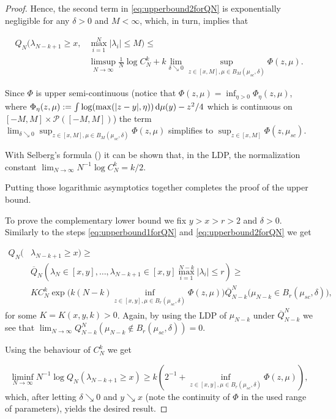\begin{proof}
	Hence, the second term in \ref{eq:upperbound2forQN} is exponentially negligible for any $\delta >0$ and $M<\infty$, which, in turn, implies that
	
	\begin{align}
		Q_N(\lambda_{N-k+1}\geq x,&\max_{i=1}^N|\lambda_i|\leq M)\leq \nonumber\\
		&\limsup_{N\rightarrow\infty}\frac{1}{N}\log C_N^k + k\lim_{\delta\searrow 0}\sup_{z\in[x,M],\mu\in B_M(\mu_{sc},\delta)}\Phi(z,\mu).
	\end{align}
	
	Since $\Phi$ is upper semi-continuous (notice that $\Phi(z,\mu)=\inf_{\eta>0}\Phi_{\eta}(z,\mu)$, where $\Phi_{\eta}(z,\mu) := \int \log(\max(|z-y|,\eta))\mathop{}\!\mathrm{d}\mu(y)-z^2/4$ which is continuous on $[-M,M]\times\mathcal P([-M,M])$) the term $\lim_{\delta\searrow 0}\sup_{z\in[x,M],\mu\in B_M(\mu_{sc},\delta)}\Phi(z,\mu)$ simplifies to $\sup_{z\in[x,M]}\Phi(z,\mu_{sc})$.
	
	
	With Selberg's formula (\cite{Mehta2004random}) it can be shown that, in the LDP, the normalization constant $\lim_{N\rightarrow\infty}N^{-1}\log C_N^k = k/2$.
	
	Putting those logarithmic asymptotics together completes the proof of the upper bound.
	
	To prove the complementary lower bound we fix $y>x>r>2$ and $\delta>0$. Similarly to the steps \ref{eq:upperbound1forQN} and \ref{eq:upperbound2forQN} we get
	
	\begin{align*}
		Q_N(&\lambda_{N-k+1}\geq x)\geq \\
		&\overline Q_N(\lambda_N\in[x,y],\dots,\lambda_{N-k+1}\in[x,y]\max_{i=1}^{N-k}|\lambda_i|\leq r)\geq\\
		&KC_N^k\exp\Big(k(N-k)\inf_{z\in[x,y],\mu\in B_r(\mu_{sc},\delta)}\Phi(z,\mu)\Big)\overline Q_{N-k}^N\big(\mu_{N-k}\in B_r(\mu_{sc},\delta)\big),
	\end{align*}
	for some $K=K(x,y,k)>0$. Again, by using the LDP of $\mu_{N-k}$ under $\overline Q_{N-k}^N$ we see that $\lim_{N\rightarrow\infty}Q_{N-k}^N(\mu_{N-k}\notin B_r(\mu_{sc},\delta))=0$.
	
	Using the behaviour of $C_N^k$ we get
	
	\begin{equation*}
		\liminf_{N\rightarrow\infty}N^{-1}\log Q_N(\lambda_{N-k+1}\geq x)\geq k(2^{-1} + \inf_{z\in[x,y],\mu\in B_r(\mu_{sc},\delta)}\Phi(z,\mu)),
	\end{equation*}
	which, after letting $\delta\searrow 0$ and $y\searrow x$ (note the continuity of $\Phi$ in the used range of parameters), yields the desired result.
\end{proof}

